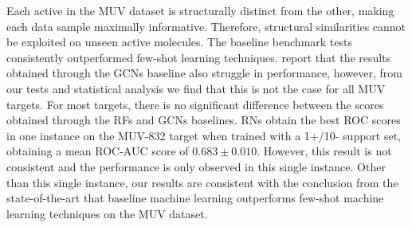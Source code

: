 Each active in the MUV dataset is structurally distinct from the other, making each data sample maximally informative. Therefore, structural similarities cannot be exploited on unseen active molecules. The baseline benchmark tests consistently outperformed few-shot learning techniques. \citet{altae2017low} report that the results obtained through the GCNs baseline also struggle in performance, however, from our tests and statistical analysis we find that this is not the case for all MUV targets. For most targets, there is no significant difference between the scores obtained through the RFs and GCNs baselines. RNs obtain the best ROC scores in one instance on the MUV-832 target when trained with a 1+/10- support set, obtaining a mean ROC-AUC score of $0.683 \pm 0.010$. However, this result is not consistent and the performance is only observed in this single instance. Other than this single instance, our results are consistent with the conclusion from the state-of-the-art that baseline machine learning outperforms few-shot machine learning techniques on the MUV dataset.

